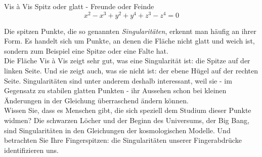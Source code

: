 \begin{surferPage}{Vis à Vis}
Spitz oder glatt - Freunde oder Feinde\\
\smallskip
\[x^2	- x^3+ y^2+ y^4+ z^3- z^4	=  0\]

\vspace{0.3cm}
Die spitzen Punkte, die so genannten {\it Singularitäten}, erkennt man häufig an ihrer Form. Es handelt sich um Punkte, an denen die Fläche nicht glatt und weich ist, sondern zum Beispiel eine Spitze oder eine Falte hat.\\
\vspace{0.3cm}
Die Fläche Vis à Vis zeigt sehr gut, was eine Singularität ist: die Spitze auf der linken Seite. Und sie zeigt auch, was sie nicht ist: der ebene Hügel auf der rechten Seite. Singularitäten sind unter anderem deshalb interessant, weil sie -
im Gegensatz zu stabilen glatten Punkten - ihr Aussehen schon bei kleinen Änderungen in der Gleichung überraschend ändern können.\\
\vspace{0.3cm}
Wissen Sie, dass es Menschen gibt, die sich speziell dem Studium dieser Punkte widmen? Die schwarzen Löcher und der Beginn des Universums, der Big Bang, sind Singularitäten in den Gleichungen der kosmologischen Modelle. Und betrachten Sie Ihre Fingerspitzen: die Singularitäten unserer Fingerabdrücke  identifizieren uns.
\end{surferPage}
